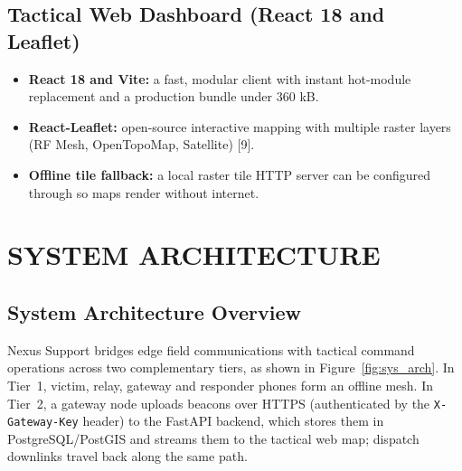 \documentclass[12pt,a4paper]{report}
\begin{document}
\section{Tactical Web Dashboard (React 18 and Leaflet)}
\begin{itemize}
    \item \textbf{React 18 and Vite:} a fast, modular client with instant hot-module replacement and a production bundle under 360 kB.
    \item \textbf{React-Leaflet:} open-source interactive mapping with multiple raster layers (RF Mesh, OpenTopoMap, Satellite) [9].
    \item \textbf{Offline tile fallback:} a local raster tile HTTP server can be configured through  so maps render without internet.
\end{itemize}

\chapter{SYSTEM ARCHITECTURE}

\section{System Architecture Overview}
Nexus Support bridges edge field communications with tactical command operations across two complementary tiers, as shown in Figure~\ref{fig:sys_arch}. In Tier~1, victim, relay, gateway and responder phones form an offline mesh. In Tier~2, a gateway node uploads beacons over HTTPS (authenticated by the \texttt{X-Gateway-Key} header) to the FastAPI backend, which stores them in PostgreSQL/PostGIS and streams them to the tactical web map; dispatch downlinks travel back along the same path.
\end{document}
